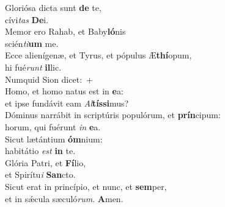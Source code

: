 \evenverse Gloriósa dicta sunt \textbf{de} te,~\*\\
\evenverse cívi\textit{tas} \textbf{De}i.\\
\oddverse Memor ero Rahab, et Baby\textbf{ló}nis~\*\\
\oddverse scién\textit{ti}\textbf{um} me.\\
\evenverse Ecce alienígenæ, et Tyrus, et pópulus Æ\textbf{thí}opum,~\*\\
\evenverse hi fué\textit{runt} \textbf{il}lic.\\
\oddverse Numquid Sion dicet:~+\\
\oddverse  Homo, et homo natus est in \textbf{e}a:~\*\\
\oddverse et ipse fundávit eam \textit{Al}\textbf{tís}\textbf{si}mus?\\
\evenverse Dóminus narrábit in scriptúris populórum, et \textbf{prín}cipum:~\*\\
\evenverse horum, qui fuérunt \textit{in} \textbf{e}a.\\
\oddverse Sicut lætántium \textbf{óm}nium:~\*\\
\oddverse habitátio \textit{est} \textbf{in} te.\\
\evenverse Glória Patri, et \textbf{Fí}lio,~\*\\
\evenverse et Spirítu\textit{i} \textbf{San}cto.\\
\oddverse Sicut erat in princípio, et nunc, et \textbf{sem}per,~\*\\
\oddverse et in sǽcula sæculó\textit{rum}. \textbf{A}men.\\
